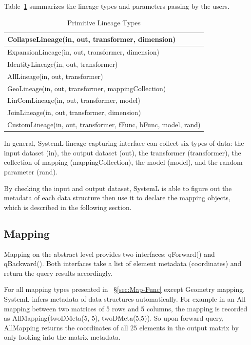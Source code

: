\documentclass{sig-alternate}
\begin{document}
Table~\ref{tb:lineage-interface} summarizes the lineage types and parameters passing by the users.
\begin{table}[ht]
\begin{center}
    \caption{Primitive Lineage Types}
    \begin{scriptsize}
    \begin{tabular}{ | p{8cm}|}
    \hline
    CollapseLineage(in, out, transformer, dimension) \\ \hline 
    ExpansionLineage(in, out, transformer, dimension) \\ \hline
    IdentityLineage(in, out, transformer) \\ \hline
    AllLineage(in, out, transformer) \\ \hline
    GeoLineage(in, out, transformer, mappingCollection) \\ \hline
    LinComLineage(in, out, transformer, model) \\ \hline
    JoinLineage(in, out, transformer, dimension) \\ \hline
    CustomLineage(in, out, transformer, fFunc, bFunc, model, rand) \\ \hline
    \end{tabular}
    \end{scriptsize}
    \label{tb:lineage-interface}
\end{center}   
\end{table}

In general, SystemL lineage capturing interface can collect six types of data: 
the input dataset (in), the output dataset (out), the transformer (transformer), 
the collection of mapping (mappingCollection), the model (model), and the random 
parameter (rand).

By checking the input and output dataset, SystemL is able to figure out the metadata of each data structure then use
it to declare the mapping objects, which is described in the following section.

\subsection{Mapping}
\label{sec:Design-Mapping}
Mapping on the abstract level provides two interfaces: qForward() and qBackward(). Both interfaces
take a list of element metadata (coordinates) and return the query results accordingly.

For all mapping types presented in ~\S\ref{sec:Map-Func} except Geometry mapping, 
SystemL infers metadata of data structures automatically. 
For example in an All mapping between two matrices of 5 rows and 5 columns,
the mapping is recorded as AllMapping(twoDMeta(5, 5), twoDMeta(5,5)). 
So upon forward query, AllMapping returns the coordinates of all 25 elements in the output matrix by only looking into the matrix metadata.
\end{document}

